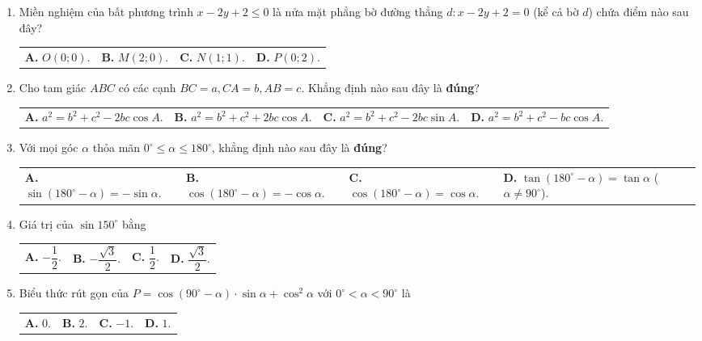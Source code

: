 \documentclass[12pt,a4paper]{article}
\makeatletter
\newcommand{\four}[4]{\par\noindent\begin{tabularx}{\linewidth}{@{}*{4}{>{\raggedright\arraybackslash}X}@{}}\textbf{A.} #1&\textbf{B.} #2&\textbf{C.} #3&\textbf{D.} #4\end{tabularx}}
\makeatother
\begin{document}
\begin{enumerate}
\item Miền nghiệm của bất phương trình $x - 2y + 2 \le 0$ là nửa mặt phẳng bờ đường thẳng $d: x - 2y + 2 = 0$ (kể cả bờ $d$) chứa điểm nào sau đây?
\four{$O(0; 0)$.}{$M(2; 0)$.}{$N(1; 1)$.}{$P(0; 2)$.}

\item Cho tam giác $ABC$ có các cạnh $BC = a, CA = b, AB = c$. Khẳng định nào sau đây là \textbf{đúng}?
\four{$a^2 = b^2 + c^2 - 2bc \cos A$.}{$a^2 = b^2 + c^2 + 2bc \cos A$.}{$a^2 = b^2 + c^2 - 2bc \sin A$.}{$a^2 = b^2 + c^2 - bc \cos A$.}

\item Với mọi góc $\alpha$ thỏa mãn $0^\circ \le \alpha \le 180^\circ$, khẳng định nào sau đây là \textbf{đúng}?
\four{$\sin(180^\circ - \alpha) = -\sin \alpha$.}{$\cos(180^\circ - \alpha) = -\cos \alpha$.}{$\cos(180^\circ - \alpha) = \cos \alpha$.}{$\tan(180^\circ - \alpha) = \tan \alpha$ ($\alpha \ne 90^\circ$).}

\item Giá trị của $\sin 150^\circ$ bằng
\four{$-\dfrac{1}{2}$.}{$-\dfrac{\sqrt{3}}{2}$.}{$\dfrac{1}{2}$.}{$\dfrac{\sqrt{3}}{2}$.}

\item Biểu thức rút gọn của $P = \cos(90^\circ - \alpha) \cdot \sin \alpha + \cos^2 \alpha$ với $0^\circ < \alpha < 90^\circ$ là
\four{$0$.}{$2$.}{$-1$.}{$1$.}
\end{enumerate}
\end{document}
